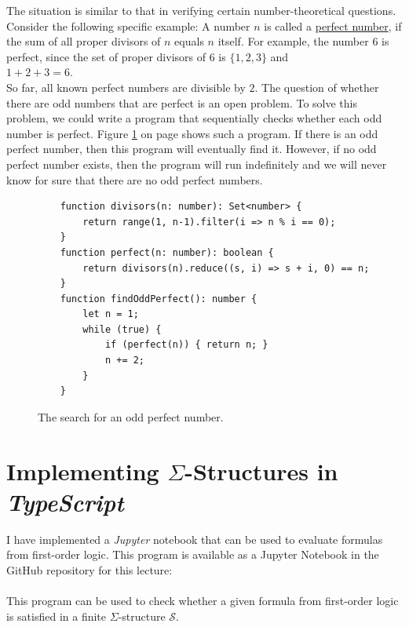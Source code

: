 The situation is similar to that in verifying certain number-theoretical
questions. Consider the following specific example: A number $n$ is called 
a \href{https://en.wikipedia.org/wiki/Perfect_number}{perfect number},
if the sum of all proper divisors of $n$ equals $n$ itself. For example, the number $6$ is perfect, since the set of proper divisors of $6$ is $\{1,2,3\}$ and 
\\[0.2cm]
\hspace*{1.3cm}
$1 + 2 + 3 = 6$.
\\[0.2cm]
So far, all known perfect numbers are divisible by $2$. The question of whether there are
odd numbers that are perfect is an open  problem. To solve this
problem, we could write a program that sequentially checks whether each
odd number is perfect. Figure \ref{fig:Find-Perfect.ipynb}
on page \pageref{fig:Find-Perfect.ipynb} shows such a program. If there is an odd perfect number,
then this program will eventually find it. However, if no
odd perfect number exists, then the program will run indefinitely and
we will never know for sure that there are no odd perfect numbers.

\begin{figure}[!ht]
  \centering
\begin{verbatim}
    function divisors(n: number): Set<number> {
        return range(1, n-1).filter(i => n % i == 0);
    }
    function perfect(n: number): boolean {
        return divisors(n).reduce((s, i) => s + i, 0) == n;
    }
    function findOddPerfect(): number {
        let n = 1;
        while (true) {
            if (perfect(n)) { return n; }
            n += 2;
        }
    }
\end{verbatim}
\vspace*{-0.3cm}
  \caption{The search for an odd perfect number.}
  \label{fig:Find-Perfect.ipynb}
\end{figure} 

\section{Implementing $\Sigma$-Structures in \textsl{TypeScript}}
I have implemented a \textsl{Jupyter} notebook that can be used to evaluate formulas from first-order logic.
This program is available as a Jupyter Notebook in the GitHub repository for this lecture:
\\[0.2cm]
\hspace*{1.3cm}
\href{https://github.com/karlstroetmann/Logic/blob/master/TypeScript/Chapter-5/01-FOL-Evaluation.ipynb}{}
\\[0.2cm]
This program can be used to check whether a given formula from first-order logic is satisfied in a finite
$\Sigma$-structure $\mathcal{S}$.

